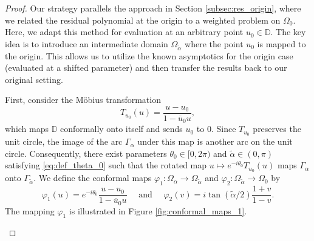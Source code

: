 \documentclass[12pt,oneside,reqno]{amsart}
\theoremstyle{definition}
\numberwithin{equation}{section}
\begin{document}
\begin{proof}
Our strategy parallels the approach in Section \ref{subsec:res_origin}, where we related the residual polynomial at the origin to a weighted problem on $\Omega_0$. Here, we adapt this method for evaluation at an arbitrary point $u_0 \in \mathbb{D}$.
The key idea is to introduce an intermediate domain $\Omega_{\tilde{\alpha}}$ where the point $u_0$ is mapped to the origin. This allows us to utilize the known asymptotics for the origin case (evaluated at a shifted parameter) and then transfer the results back to our original setting.



First, consider the Möbius transformation
\[
    T_{u_0}(u) = \frac{u - u_0}{1 - \overline{u}_0 u},
\]
which maps $\mathbb{D}$ conformally onto itself and sends $u_0$ to $0$. Since $T_{u_0}$ preserves the unit circle, the image of the arc $\Gamma_\alpha$ under this map is another arc on the unit circle. Consequently, there exist parameters $\theta_0 \in [0, 2\pi)$ and $\tilde{\alpha} \in (0, \pi)$ satisfying \eqref{eq:def_theta_0} such that the rotated map $u \mapsto e^{-i\theta_0}T_{u_0}(u)$ maps $\Gamma_\alpha$ onto $\Gamma_{\tilde{\alpha}}$.
We define the conformal maps $\varphi_1: \Omega_\alpha \rightarrow \Omega_{\tilde{\alpha}}$ and $\varphi_2: \Omega_{\tilde{\alpha}} \rightarrow \Omega_0$ by
\begin{equation}
    \varphi_1(u) = e^{-i\theta_0} \frac{u - u_0}{1 - \overline{u}_0 u} \quad \mbox{ and } \quad
    \varphi_2(v) = i \tan(\tilde{\alpha}/{2})\frac{1 + v}{1 - v}.
\end{equation}
The mapping $\varphi_1$ is illustrated in Figure \ref{fig:conformal_maps_1}.




\begin{figure}[h]
\begin{center}
\end{center}
\end{figure}
\end{proof}
\end{document}
